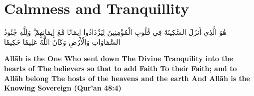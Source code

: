 \chapter{Calmness and Tranquillity}
\begin{center}
    {\Huge    
        \begin{Arabic}
            هُوَ الَّذِي أَنزَلَ السَّكِينَةَ فِي قُلُوبِ الْمُؤْمِنِينَ لِيَزْدَادُوا إِيمَانًا مَّعَ إِيمَانِهِمْ ۗ وَلِلَّهِ جُنُودُ السَّمَاوَاتِ وَالْأَرْضِ  وَكَانَ اللَّهُ عَلِيمًا حَكِيمًا
        \end{Arabic}
    }
\end{center}
\vspace*{\fill}
\vspace{3cm}
\begin{center}
    \large \textbf{Allāh is the One Who sent down The Divine Tranquility into the hearts of The believers so that to add Faith To their Faith; and to Allāh belong The hosts of the heavens and the earth And Allāh is the Knowing Sovereign (Qur'an 48:4)}
\end{center}
